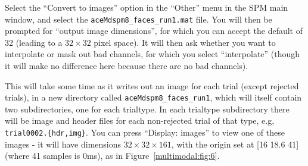 Select the ``Convert to images'' option in the ``Other'' menu in the SPM main window, and select the \texttt{aceMdspm8\_faces\_run1.mat} file. You will then be prompted for ``output image dimensions'', for which you can accept the default of 32 (leading to a $32\times 32$ pixel space). It will then ask whether you want to interpolate or mask out bad channels, for which you select ``interpolate'' (though it will make no difference here because there are no bad channels).

This will take some time as it writes out an image for each trial (except rejected trials), in a new directory called \texttt{aceMdspm8\_faces\_run1}, which will itself contain two subdirectories, one for each trialtype. In each trialtype subdirectory there will be image and header files for each non-rejected trial of that type, e.g, \texttt{trial0002.\{hdr,img\}}. You can press ``Display: images'' to view one of these images - it will have dimensions $32\times 32\times 161$, with the origin set at [16 18.6 41] (where 41 samples is 0ms), as in Figure~\ref{multimodal:fig:6}.

